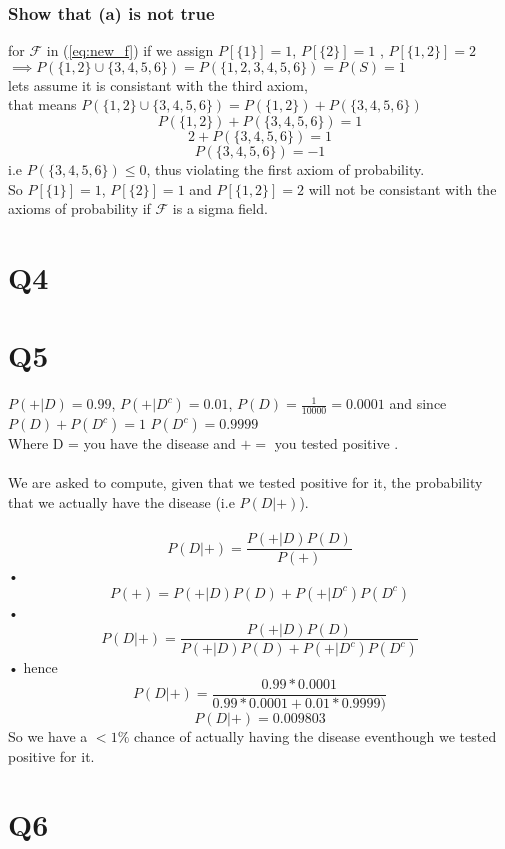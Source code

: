 \documentclass[a4paper,11pt]{article}
\begin{document}
\subsubsection*{Show that (a) is not true}
for $\mathcal{F}$ in (\ref{eq:new_f}) if we assign  $P[\{1\}]=1$, $P[\{2\}]=1$ , $P[\{1,2\}]=2$\\
$\implies P(\{1,2\} \cup \{3,4,5,6\})= P(\{1,2,3,4,5,6\})=P(S)=1$ \\
lets assume  it is consistant with the third axiom,\\ that means $P(\{1,2\} \cup \{3,4,5,6\}) =  P(\{1,2\})+P(\{3,4,5,6\})$\\
 $$P(\{1,2\})+P(\{3,4,5,6\}) = 1$$
 $$2+ P(\{3,4,5,6\}) = 1 $$
 $$ P(\{3,4,5,6\}) = -1 $$
 i.e $P(\{3,4,5,6\}) \le 0$, thus violating the first axiom of probability.\\
 So $P[\{1\}]=1$, $P[\{2\}]=1$ and $P[\{1,2\}]=2$ will not be consistant with the  axioms of probability if $\mathcal{F}$ is a sigma field.
 
\newpage
\section*{Q4}



\newpage
\section*{Q5}
$P(+|D)=0.99$, $P(+|D^{c})=0.01$, $P(D)=\frac{1}{10000}=0.0001$ and since $P(D)+ P(D^c) = 1$ $P(D^c) = 0.9999$\\ 
Where D = you have the disease and $+ = $ you tested positive .\\\\
We are asked to compute, given that we tested positive for it, the probability that we actually have the disease (i.e $P(D|+)$).\\\\
\begin{equation}
P(D|+) =\frac{P(+|D)P(D)}{P(+)}
\end{equation}• 
\begin{equation}
P(+) = P(+|D)P(D) +P(+|D^c)P(D^c)
\end{equation}• 
\begin{equation}
P(D|+) =\frac{P(+|D)P(D)}{ P(+|D)P(D) +P(+|D^c)P(D^c)}
\end{equation}• 
hence 
$$P(D|+) = \frac{0.99*0.0001}{0.99*0.0001  + 0.01*0.9999)}$$
$$P(D|+) = 0.009803$$
So we have a $<1\%$  chance of actually having the disease eventhough we tested positive for it.
\newpage

\section*{Q6}
\end{document}
